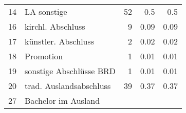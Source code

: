 \begin{longtable}{lXrrr}
     14 &
     \multicolumn{1}{X}{ LA sonstige   } &


       \num{52} &
       \num[round-mode=places,round-precision=2]{0,5} &
         \num[round-mode=places,round-precision=2]{0,5} \\

     16 &
     \multicolumn{1}{X}{ kirchl. Abschluss   } &


       \num{9} &
       \num[round-mode=places,round-precision=2]{0,09} &
         \num[round-mode=places,round-precision=2]{0,09} \\

     17 &
     \multicolumn{1}{X}{ künstler. Abschluss   } &


       \num{2} &
       \num[round-mode=places,round-precision=2]{0,02} &
         \num[round-mode=places,round-precision=2]{0,02} \\

     18 &
     \multicolumn{1}{X}{ Promotion   } &


       \num{1} &
       \num[round-mode=places,round-precision=2]{0,01} &
         \num[round-mode=places,round-precision=2]{0,01} \\

     19 &
     \multicolumn{1}{X}{ sonstige Abschlüsse BRD   } &


       \num{1} &
       \num[round-mode=places,round-precision=2]{0,01} &
         \num[round-mode=places,round-precision=2]{0,01} \\

     20 &
     \multicolumn{1}{X}{ trad. Auslandsabschluss   } &


       \num{39} &
       \num[round-mode=places,round-precision=2]{0,37} &
         \num[round-mode=places,round-precision=2]{0,37} \\

     27 &
     \multicolumn{1}{X}{ Bachelor im Ausland   } &



\end{longtable}
